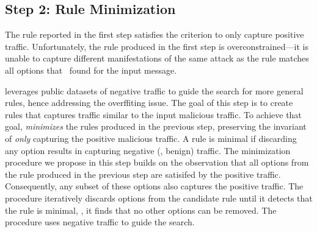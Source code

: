 \documentclass[runningheads]{llncs}
\begin{document}
\subsection{Step 2: Rule Minimization}

The rule reported in the first step satisfies the criterion to only
capture positive traffic. Unfortunately, the rule produced in the
first step is overconstrained---it is unable to capture different
manifestations of the same attack as the rule matches all options that
\tname\ found for the input message.


\tname{} leverages public datasets\cite{tcpreplay} of negative traffic
to guide the search for more general rules, hence addressing the
overffiting issue. The goal of this step is to create rules that
captures traffic similar to the input malicious traffic. To achieve
that goal, \tname{} \emph{minimizes} the rules produced in the
previous step, preserving the invariant of \emph{only} capturing the
positive malicious traffic. A rule is minimal if discarding any option
results in capturing negative (\ie{}, benign) traffic.  The
minimization procedure we propose in this step builds on the
observation that all options from the rule produced in the previous
step are satisifed by the positive traffic. Consequently, any subset
of these options also captures the positive traffic. The procedure
iteratively discards options from the candidate rule until it detects
that the rule is minimal, \ie{}, it finds that no other options can be
removed. The procedure uses negative traffic to guide the search.
\end{document}
